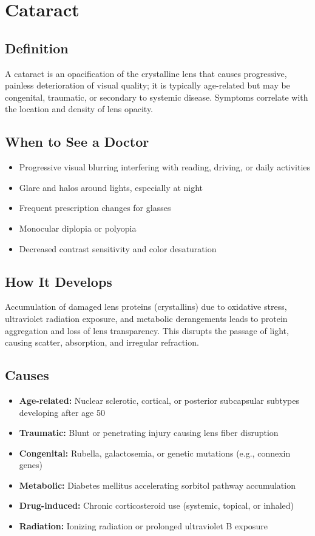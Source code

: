 \chapter{Cataract}

\section*{Definition}
A cataract is an opacification of the crystalline lens that causes progressive, painless deterioration of visual quality; it is typically age-related but may be congenital, traumatic, or secondary to systemic disease. Symptoms correlate with the location and density of lens opacity.

\section*{When to See a Doctor}

\begin{itemize}
 \item Progressive visual blurring interfering with reading, driving, or daily activities
 \item Glare and halos around lights, especially at night
 \item Frequent prescription changes for glasses
 \item Monocular diplopia or polyopia
 \item Decreased contrast sensitivity and color desaturation
\end{itemize}

\section*{How It Develops}
Accumulation of damaged lens proteins (crystallins) due to oxidative stress, ultraviolet radiation exposure, and metabolic derangements leads to protein aggregation and loss of lens transparency. This disrupts the passage of light, causing scatter, absorption, and irregular refraction.

\section*{Causes}
\begin{itemize}
 \item \textbf{Age-related:} Nuclear sclerotic, cortical, or posterior subcapsular subtypes developing after age 50
 \item \textbf{Traumatic:} Blunt or penetrating injury causing lens fiber disruption
 \item \textbf{Congenital:} Rubella, galactosemia, or genetic mutations (e.g., connexin genes)
 \item \textbf{Metabolic:} Diabetes mellitus accelerating sorbitol pathway accumulation
 \item \textbf{Drug-induced:} Chronic corticosteroid use (systemic, topical, or inhaled)
 \item \textbf{Radiation:} Ionizing radiation or prolonged ultraviolet B exposure
\end{itemize}

